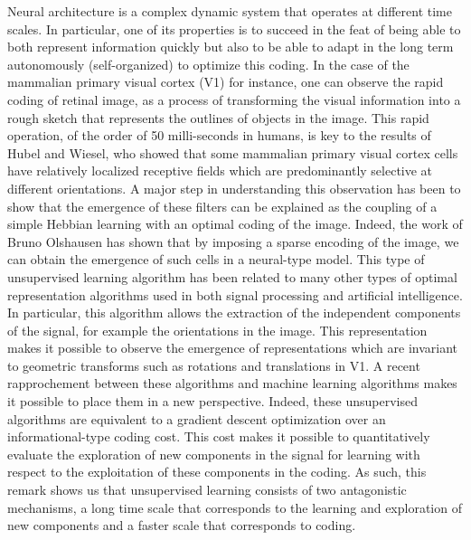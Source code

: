 \documentclass[a4paper, 11pt]{article} %
\begin{document}
Neural architecture is a complex dynamic system that operates at
different time scales. In particular, one of its properties is to
succeed in the feat of being able to both represent information quickly
but also to be able to adapt in the long term autonomously
(self-organized) to optimize this coding. In the case of the mammalian
primary visual cortex (V1) for instance, one can observe the rapid
coding of retinal image, as a process of transforming the visual
information into a rough sketch that represents the outlines of objects
in the image. This rapid operation, of the order of 50 milli-seconds in
humans, is key to the results of Hubel and Wiesel, who showed that some
mammalian primary visual cortex cells have relatively localized
receptive fields which are predominantly selective at different
orientations. A major step in understanding this observation has been to
show that the emergence of these filters can be explained as the
coupling of a simple Hebbian learning with an optimal coding of the
image. Indeed, the work of Bruno Olshausen has shown that by imposing a
sparse encoding of the image, we can obtain the emergence of such cells
in a neural-type model. This type of unsupervised learning algorithm has
been related to many other types of optimal representation algorithms
used in both signal processing and artificial intelligence. In
particular, this algorithm allows the extraction of the independent
components of the signal, for example the orientations in the image.
This representation makes it possible to observe the emergence of
representations which are invariant to geometric transforms such as
rotations and translations in V1. A recent rapprochement between these
algorithms and machine learning algorithms makes it possible to place
them in a new perspective. Indeed, these unsupervised algorithms are
equivalent to a gradient descent optimization over an informational-type
coding cost. This cost makes it possible to quantitatively evaluate the
exploration of new components in the signal for learning with respect to
the exploitation of these components in the coding. As such, this remark
shows us that unsupervised learning consists of two antagonistic
mechanisms, a long time scale that corresponds to the learning and
exploration of new components and a faster scale that corresponds to
coding.
\end{document}
